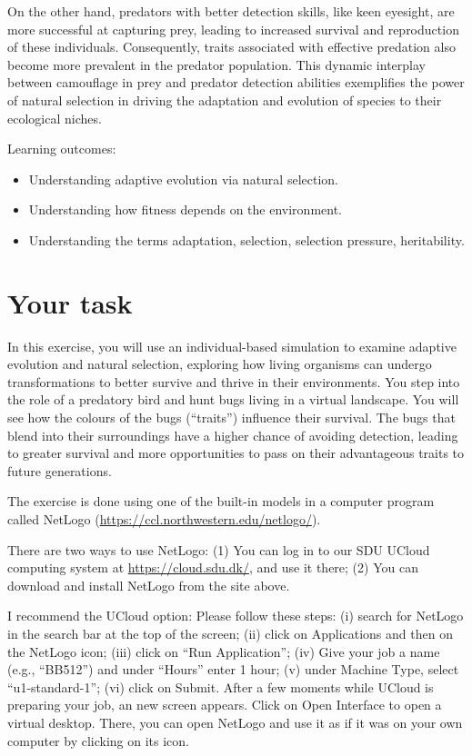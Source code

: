 \documentclass[
  a4paper]{book}
\providecommand{\tightlist}{%
  \setlength{\itemsep}{0pt}\setlength{\parskip}{0pt}}
\begin{document}
On the other hand, predators with better detection skills, like keen eyesight, are more successful at capturing prey, leading to increased survival and reproduction of these individuals. Consequently, traits associated with effective predation also become more prevalent in the predator population. This dynamic interplay between camouflage in prey and predator detection abilities exemplifies the power of natural selection in driving the adaptation and evolution of species to their ecological niches.

\begin{do-something}
Learning outcomes:

\begin{itemize}
\tightlist
\item
  Understanding adaptive evolution via natural selection.
\item
  Understanding how fitness depends on the environment.
\item
  Understanding the terms adaptation, selection, selection pressure,
  heritability.
\end{itemize}
\end{do-something}

\section{Your task}\label{your-task-1}

In this exercise, you will use an individual-based simulation to examine adaptive evolution and natural selection, exploring how living organisms can undergo transformations to better survive and thrive in their environments. You step into the role of a predatory bird and hunt bugs living in a virtual landscape. You will see how the colours of the bugs (``traits'') influence their survival. The bugs that blend into their surroundings have a higher chance of avoiding detection, leading to greater survival and more opportunities to pass on their advantageous traits to future generations.

The exercise is done using one of the built-in models in a computer program called NetLogo (\url{https://ccl.northwestern.edu/netlogo/}).

There are two ways to use NetLogo: (1) You can log in to our SDU UCloud computing system at \url{https://cloud.sdu.dk/}, and use it there; (2) You can download and install NetLogo from the site above.

I recommend the UCloud option: Please follow these steps: (i) search for NetLogo in the search bar at the top of the screen; (ii) click on Applications and then on the NetLogo icon; (iii) click on ``Run Application''; (iv) Give your job a name (e.g., ``BB512'') and under ``Hours'' enter 1 hour; (v) under Machine Type, select ``u1-standard-1''; (vi) click on Submit. After a few moments while UCloud is preparing your job, an new screen appears. Click on Open Interface to open a virtual desktop. There, you can open NetLogo and use it as if it was on your own computer by clicking on its icon.
\end{document}
